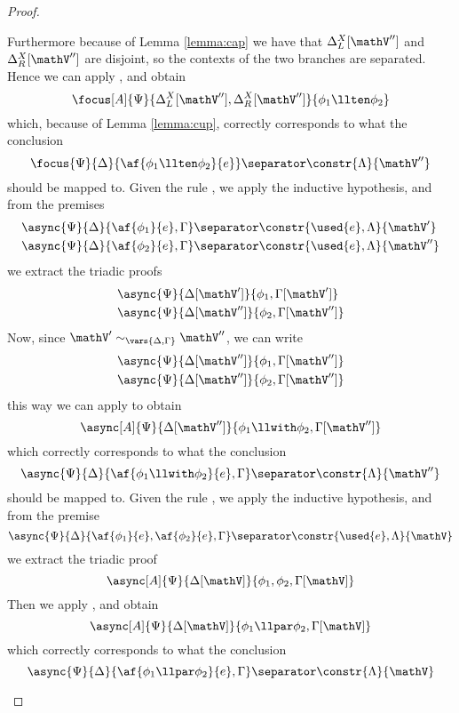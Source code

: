\begin{proof}
\begin{itemize}
			Furthermore because of Lemma \ref{lemma:cap} we have that $\Delta_L^X[\mathV'']$ and $\Delta_R^X[\mathV'']$ are disjoint, so the contexts of the two branches are separated.
			Hence we can apply \derRule[A]{\displayten}, and obtain
			$$ \focus[A]{\Psi}{\Delta_L^X[\mathV''], \Delta_R^X[\mathV'']}{\phi_1 \llten \phi_2} $$
			which, because of Lemma \ref{lemma:cup}, correctly corresponds to what the conclusion
			$$ \focus{\Psi}{\Delta}{\af{\phi_1 \llten \phi_2}{e}} \separator \constr{\Lambda}{\mathV''} $$
			should be mapped to.
		\indCase{\displaywith} Given the rule \derRule{\displaywith}, we apply the inductive hypothesis, and from the premises
			\begin{align*}
				&\async{\Psi}{\Delta}{\af{\phi_1}{e}, \Gamma} \separator \constr{\used{e}, \Lambda}{\mathV'} \\
				&\async{\Psi}{\Delta}{\af{\phi_2}{e}, \Gamma} \separator \constr{\used{e}, \Lambda}{\mathV''} 
			\end{align*}
			we extract the triadic proofs
			\begin{align*}
			 	&\async{\Psi}{\Delta[\mathV']}{\phi_1, \Gamma[\mathV']}\\
			 	&\async{\Psi}{\Delta[\mathV'']}{\phi_2, \Gamma[\mathV'']} 
			\end{align*}
			Now, since $\mathV' \sim_{\vars{\Delta, \Gamma}} \mathV''$, we can write
			\begin{align*}
				&\async{\Psi}{\Delta[\mathV'']}{\phi_1, \Gamma[\mathV'']} \\
				&\async{\Psi}{\Delta[\mathV'']}{\phi_2, \Gamma[\mathV'']} 
			\end{align*}
			this way we can apply \derRule[A]{\displaywith} to obtain
			$$ \async[A]{\Psi}{\Delta[\mathV'']}{\phi_1 \llwith \phi_2, \Gamma[\mathV'']} $$
			which correctly corresponds to what the conclusion
			$$ \async{\Psi}{\Delta}{\af{\phi_1 \llwith \phi_2}{e}, \Gamma} \separator \constr{\Lambda}{\mathV''} $$
			should be mapped to.
		\indCase{\displaypar} Given the rule \derRule{\displaypar}, we apply the inductive hypothesis, and from the premise
			$$ \async{\Psi}{\Delta}{\af{\phi_1}{e}, \af{\phi_2}{e}, \Gamma} \separator \constr{\used{e}, \Lambda}{\mathV}$$
			we extract the triadic proof 
			$$\async[A]{\Psi}{\Delta[\mathV]}{\phi_1, \phi_2, \Gamma[\mathV]} $$
			Then we apply \derRule[A]{\displaypar}, and obtain
			$$\async[A]{\Psi}{\Delta[\mathV]}{\phi_1 \llpar \phi_2, \Gamma[\mathV]} $$
			which correctly corresponds to what the conclusion
			$$ \async{\Psi}{\Delta}{\af{\phi_1 \llpar \phi_2}{e}, \Gamma} \separator \constr{\Lambda}{\mathV} $$

\end{itemize}
\end{proof}
